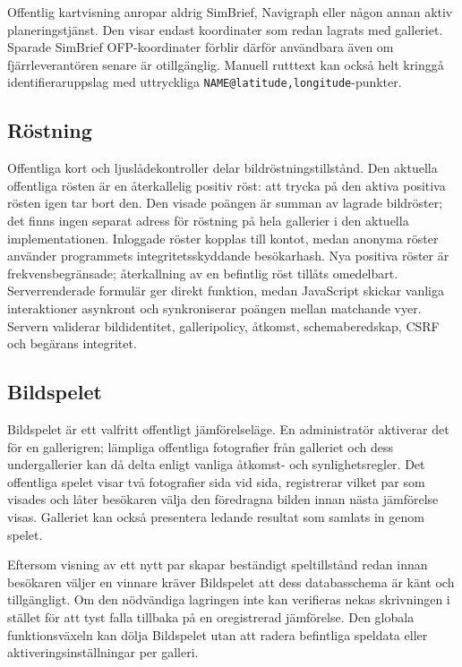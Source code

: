 \documentclass[11pt,a4paper]{article}
\newcommand{\codeword}[1]{\nolinkurl{#1}}
\begin{document}
Offentlig kartvisning anropar aldrig SimBrief, Navigraph eller någon annan aktiv
planeringstjänst. Den visar endast koordinater som redan lagrats med galleriet.
Sparade SimBrief OFP-koordinater förblir därför användbara även om
fjärrleverantören senare är otillgänglig. Manuell rutttext kan också helt
kringgå identifieraruppslag med uttryckliga
\codeword{NAME@latitude,longitude}-punkter.

\subsection{Röstning}

Offentliga kort och ljuslådekontroller delar bildröstningstillstånd. Den
aktuella offentliga rösten är en återkallelig positiv röst: att trycka på den
aktiva positiva rösten igen tar bort den. Den visade poängen är summan av
lagrade bildröster; det finns ingen separat adress för röstning på hela
gallerier i den aktuella implementationen. Inloggade röster kopplas till kontot,
medan anonyma röster använder programmets integritetsskyddande besökarhash. Nya
positiva röster är frekvensbegränsade; återkallning av en befintlig röst tillåts
omedelbart. Serverrenderade formulär ger direkt funktion, medan JavaScript
skickar vanliga interaktioner asynkront och synkroniserar poängen mellan
matchande vyer. Servern validerar bildidentitet, galleripolicy, åtkomst,
schemaberedskap, CSRF och begärans integritet.

\subsection{Bildspelet}

Bildspelet är ett valfritt offentligt jämförelseläge. En administratör aktiverar
det för en gallerigren; lämpliga offentliga fotografier från galleriet och dess
undergallerier kan då delta enligt vanliga åtkomst- och synlighetsregler. Det
offentliga spelet visar två fotografier sida vid sida, registrerar vilket par
som visades och låter besökaren välja den föredragna bilden innan nästa
jämförelse visas. Galleriet kan också presentera ledande resultat som samlats in
genom spelet.

Eftersom visning av ett nytt par skapar beständigt speltillstånd redan innan
besökaren väljer en vinnare kräver Bildspelet att dess databasschema är känt och
tillgängligt. Om den nödvändiga lagringen inte kan verifieras nekas skrivningen
i stället för att tyst falla tillbaka på en oregistrerad jämförelse. Den globala
funktionsväxeln kan dölja Bildspelet utan att radera befintliga speldata eller
aktiveringsinställningar per galleri.
\end{document}
